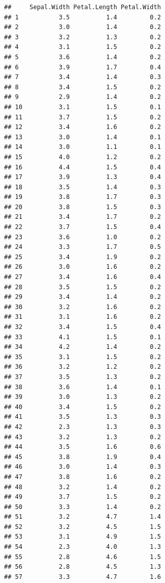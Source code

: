 \documentclass[
]{book}
\begin{document}
\begin{verbatim}
##     Sepal.Width Petal.Length Petal.Width
## 1           3.5          1.4         0.2
## 2           3.0          1.4         0.2
## 3           3.2          1.3         0.2
## 4           3.1          1.5         0.2
## 5           3.6          1.4         0.2
## 6           3.9          1.7         0.4
## 7           3.4          1.4         0.3
## 8           3.4          1.5         0.2
## 9           2.9          1.4         0.2
## 10          3.1          1.5         0.1
## 11          3.7          1.5         0.2
## 12          3.4          1.6         0.2
## 13          3.0          1.4         0.1
## 14          3.0          1.1         0.1
## 15          4.0          1.2         0.2
## 16          4.4          1.5         0.4
## 17          3.9          1.3         0.4
## 18          3.5          1.4         0.3
## 19          3.8          1.7         0.3
## 20          3.8          1.5         0.3
## 21          3.4          1.7         0.2
## 22          3.7          1.5         0.4
## 23          3.6          1.0         0.2
## 24          3.3          1.7         0.5
## 25          3.4          1.9         0.2
## 26          3.0          1.6         0.2
## 27          3.4          1.6         0.4
## 28          3.5          1.5         0.2
## 29          3.4          1.4         0.2
## 30          3.2          1.6         0.2
## 31          3.1          1.6         0.2
## 32          3.4          1.5         0.4
## 33          4.1          1.5         0.1
## 34          4.2          1.4         0.2
## 35          3.1          1.5         0.2
## 36          3.2          1.2         0.2
## 37          3.5          1.3         0.2
## 38          3.6          1.4         0.1
## 39          3.0          1.3         0.2
## 40          3.4          1.5         0.2
## 41          3.5          1.3         0.3
## 42          2.3          1.3         0.3
## 43          3.2          1.3         0.2
## 44          3.5          1.6         0.6
## 45          3.8          1.9         0.4
## 46          3.0          1.4         0.3
## 47          3.8          1.6         0.2
## 48          3.2          1.4         0.2
## 49          3.7          1.5         0.2
## 50          3.3          1.4         0.2
## 51          3.2          4.7         1.4
## 52          3.2          4.5         1.5
## 53          3.1          4.9         1.5
## 54          2.3          4.0         1.3
## 55          2.8          4.6         1.5
## 56          2.8          4.5         1.3
## 57          3.3          4.7         1.6

\end{verbatim}
\end{document}
